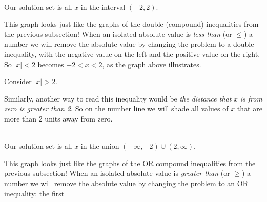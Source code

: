 \documentclass[12pt]{book}
\theoremstyle{definition}
\begin{document}
\begin{center}
\\
Our solution set is all $x$ in the interval $(-2,2)$.
\end{center}
This graph looks just like the graphs of the double (compound) inequalities from the previous subsection!  When an isolated absolute value is {\it less than} (or $\leq$) a number we will remove the absolute value by changing the problem to a double inequality, with the negative value on the left and the positive value on the right. So $|x| < 2$ becomes $- 2 < x < 2$, as the graph above illustrates.\par
Consider $|x| > 2$.\par
Similarly, another way to read this inequality would be {\it the distance that} $x$ {\it is from zero is greater than 2}. So on the number line we will shade all values of $x$ that are more than 2 units away from zero.\par
\begin{center}
\\
Our solution set is all $x$ in the union $(-\infty,-2)\cup(2,\infty)$.
\end{center}
This graph looks just like the graphs of the OR compound inequalities from the previous subsection! When an isolated absolute value is {\it greater than} (or $\geq$) a number we will remove the absolute value by changing the problem to an OR inequality: the first
\end{document}
